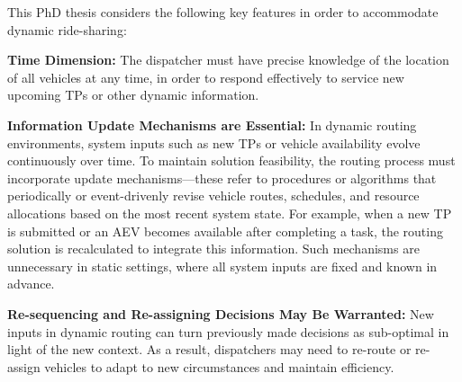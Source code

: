 This PhD thesis considers the following key features in order to accommodate dynamic ride-sharing:

\textbf{Time Dimension:} 
The dispatcher must have precise knowledge of the location of all vehicles at any time, in order to respond effectively to service new upcoming TPs or other dynamic information.


\textbf{Information Update Mechanisms are Essential:} 
In dynamic routing environments, system inputs such as new TPs or vehicle availability evolve continuously over time. To maintain solution feasibility, the routing process must incorporate update mechanisms—these refer to procedures or algorithms that periodically or event-drivenly revise vehicle routes, schedules, and resource allocations based on the most recent system state. For example, when a new TP is submitted or an AEV becomes available after completing a task, the routing solution is recalculated to integrate this information. Such mechanisms are unnecessary in static settings, where all system inputs are fixed and known in advance.

\textbf{Re-sequencing and Re-assigning Decisions May Be Warranted:} 
New inputs in dynamic routing can turn previously made decisions as sub-optimal in light of the new context. As a result, dispatchers may need to re-route or re-assign vehicles to adapt to new circumstances and maintain efficiency.

